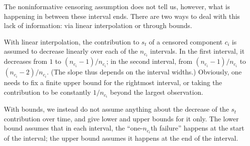 \documentclass[12pt, a4paper]{elsarticle}
\begin{document}
The noninformative censoring assumption does not tell us, however,
what is happening in between these interval ends.
There are two ways to deal with this lack of information:
via linear interpolation or through bounds.

With linear interpolation, the contribution to $s_t$ of a censored component $c_i$ 
is assumed to decrease linearly over each of the $n_{c_i}$ intervals.
In the first interval, it decreases from $1$ to $(n_{c_i} - 1)/n_{c_i}$;
in the second interval, from $(n_{c_i} - 1)/n_{c_i}$ to $(n_{c_i} - 2)/n_{c_i}$.
(The slope thus depends on the interval widths.)
Obviously, one needs to fix a finite upper bound for the rightmost interval,
or taking the contribution to be constantly $1/n_{c_i}$ beyond the largest observation.

With bounds, we instead do not assume anything about the decrease
of the $s_t$ contribution over time,
and give lower and upper bounds for it only.
The lower bound assumes that in each interval,
the ``one-$n_{c_i}$th failure'' happens at the start of the interval;
the upper bound assumes it happens at the end of the interval.
\end{document}
